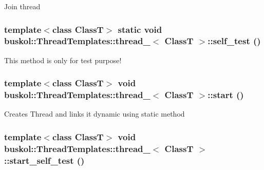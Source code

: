 Join thread 

\hypertarget{classbuskol_1_1ThreadTemplates_1_1thread__1_ac33a5aa33679452b203c539401c92929}{
\subsubsection[{self\_\-test}]{\setlength{\rightskip}{0pt plus 5cm}template$<$class ClassT$>$ static void {\bf buskol::ThreadTemplates::thread\_}$<$ ClassT $>$::self\_\-test ()}}
\label{classbuskol_1_1ThreadTemplates_1_1thread__1_ac33a5aa33679452b203c539401c92929}


This method is only for test purpose! 

\hypertarget{classbuskol_1_1ThreadTemplates_1_1thread__1_a71250f676aa96d06d5b693b685af7555}{
\subsubsection[{start}]{\setlength{\rightskip}{0pt plus 5cm}template$<$class ClassT$>$ void {\bf buskol::ThreadTemplates::thread\_}$<$ ClassT $>$::start ()}}
\label{classbuskol_1_1ThreadTemplates_1_1thread__1_a71250f676aa96d06d5b693b685af7555}


Creates Thread and links it dynamic using static method 

\hypertarget{classbuskol_1_1ThreadTemplates_1_1thread__1_ad3a839cb3ec07abf8cf54fe81fd5e7f3}{
\subsubsection[{start\_\-self\_\-test}]{\setlength{\rightskip}{0pt plus 5cm}template$<$class ClassT$>$ void {\bf buskol::ThreadTemplates::thread\_}$<$ ClassT $>$::start\_\-self\_\-test ()}}
\label{classbuskol_1_1ThreadTemplates_1_1thread__1_ad3a839cb3ec07abf8cf54fe81fd5e7f3}



